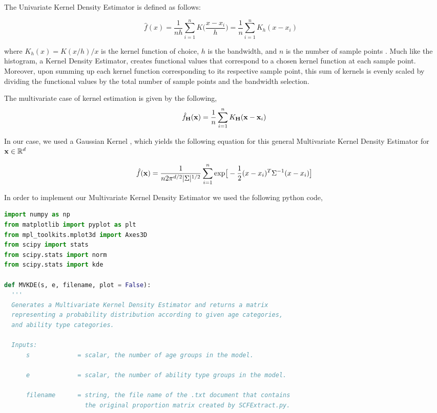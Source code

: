 \documentclass[letterpaper,12pt]{article}
\theoremstyle{definition}
\begin{document}
\begin{spacing}{1.5}
    The Univariate Kernel Density Estimator is defined as follows:

    \[\hat{f}(x) = \frac{1}{nh} \sum_{i=1}^n K\Big(\frac{x-x_i}{h}\Big)= \frac{1}{n}\sum_{i=1}^n K_h (x - x_i) \quad \]

    where $K_h(x) =  K(x/h)/x$ is the kernel function of choice, $h$ is the bandwidth, and $n$ is the number of sample points \citet{Scott:2015}. Much like the histogram, a Kernel Density Estimator, creates functional values that correspond to a chosen kernel function at each sample point. Moreover, upon summing up each kernel function corresponding to its respective sample point, this sum of kernels is evenly scaled by dividing the functional values by the total number of sample points and the bandwidth selection.

    The multivariate case of kernel estimation is given by the following,
    \[\hat{f}_\bold{H}(\bold{x})= \frac1n \sum_{i=1}^n K_\bold{H} (\bold{x} - \bold{x}_i)\]

    In our case, we used a Gaussian Kernel , which yields the following equation for this general Multivariate Kernel Density Estimator for $\bold{x} \in \mathbb{R}^d$

    \[\hat{f}(\bold{x}) = \frac{1}{n2\pi ^{d/2} |\Sigma|^{1/2}} \sum_{i=1}^n \text{exp}\big[-\frac{1}{2}(x-x_i)^T\Sigma ^{-1}(x-x_i)\big]\]
    \citet{Scott:2005}

    In order to implement our Multivariate Kernel Density Estimator we used the following python code,\\

    \begin{lstlisting}[language=Python, caption=MVKDE.py]
import numpy as np
from matplotlib import pyplot as plt
from mpl_toolkits.mplot3d import Axes3D
from scipy import stats
from scipy.stats import norm
from scipy.stats import kde

def MVKDE(s, e, filename, plot = False):
  '''
  Generates a Multivariate Kernel Density Estimator and returns a matrix
  representing a probability distribution according to given age categories,
  and ability type categories.

  Inputs:
      s             = scalar, the number of age groups in the model.

      e             = scalar, the number of ability type groups in the model.

      filename      = string, the file name of the .txt document that contains 
                      the original proportion matrix created by SCFExtract.py.


\end{lstlisting}
\end{spacing}
\end{document}
